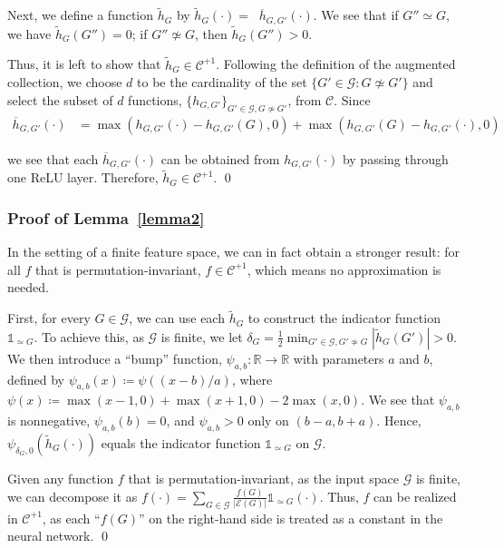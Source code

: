 \documentclass{article}
\def\Gfun{\mathcal{G}}
\begin{document}
Next, we define a function $\tilde{h}_G$ by $\tilde{h}_G(\cdot) = \mathop{\sum_{G' \in \Gfun, G' \not\simeq G}} \overline{h}_{G, G'}(\cdot)$. We see that if $G'' \simeq G$, we have $\tilde{h}_G(G'') = 0$; if $G'' \not\simeq G$, then  $\tilde{h}_G(G'') > 0$.

Thus, it is left to show that $\tilde{h}_G \in \mathcal{C}^{+1}$. Following the definition of the augmented collection, we choose $d$ to be the cardinality of the set $\{ G' \in \Gfun: G \not\simeq G' \}$ and select the subset of $d$ functions, $\{h_{G, G'}\}_{G' \in \Gfun, G \not\simeq G'}$, from $\mathcal{C}$. Since
\begin{equation*}
\label{hbar}
\begin{split}
    \overline{h}_{G, G'}(\cdot) &= \max(h_{G, G'}(\cdot) - h_{G, G'}(G), 0) + \max(h_{G, G'}(G) - h_{G, G'}(\cdot), 0) 
\end{split}
\end{equation*}

we see that each $\overline{h}_{G, G'}(\cdot)$ can be obtained from $h_{G, G'}(\cdot)$ by passing through one ReLU layer. Therefore, $\tilde{h}_G \in \mathcal{C}^{+1}$.
\qed

\subsubsection{Proof of Lemma~\ref{lemma2}}
In the setting of a finite feature space, we can in fact obtain a stronger result: for all $f$ that is permutation-invariant, $f \in \mathcal{C}^{+1}$, which means no approximation is needed.

First, for every $G \in \Gfun$, we can use each $\tilde{h}_G$ to construct the indicator function $\mathds{1}_{\simeq G}$. To achieve this, as $\Gfun$ is finite, we let $\delta_G = \frac{1}{2} \min_{G' \in \Gfun, G' \not\simeq G} |\tilde{h}_G(G')| > 0$. We then introduce a ``bump'' function, $\psi_{a, b}: \mathbb{R} \to \mathbb{R}$ with parameters $a$ and $b$, defined by $\psi_{a, b}(x) \coloneqq \psi((x-b)/a)$, where $\psi(x) \coloneqq \max(x-1, 0) + \max(x+1, 0) - 2 \max(x, 0)$. We see that $\psi_{a, b}$ is nonnegative, $\psi_{a, b}(b) = 0$, and $\psi_{a, b} > 0$ only on $(b-a, b+a)$. Hence, $\psi_{\delta_G, 0}(\tilde{h}_G(\cdot))$ equals the indicator function $\mathds{1}_{\simeq G}$ on $\Gfun$.

Given any function $f$ that is permutation-invariant, as the input space $\Gfun$ is finite, we can decompose it as
$f(\cdot) = \sum_{G \in \Gfun} \frac{f(G)}{|\mathcal{E}(G)|} \mathds{1}_{\simeq G}(\cdot)$.
Thus, $f$ can be realized in $\mathcal{C}^{+1}$, as each ``$f(G)$'' on the right-hand side is treated as a constant in the neural network.
\qed
\end{document}
